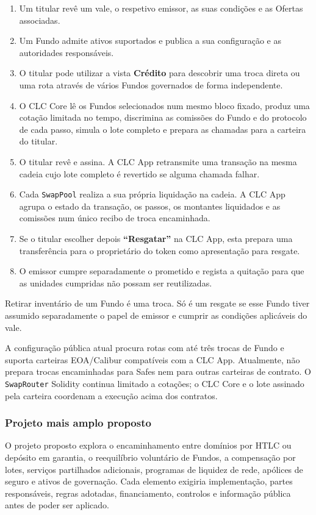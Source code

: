 \documentclass[11pt]{article}
\begin{document}
\begin{enumerate}[leftmargin=*]
\item Um titular revê um vale, o respetivo emissor, as suas condições e as Ofertas associadas.
\item Um Fundo admite ativos suportados e publica a sua configuração e as autoridades responsáveis.
\item O titular pode utilizar a vista \textbf{Crédito} para descobrir uma troca direta ou uma rota através de vários Fundos governados de forma independente.
\item O CLC Core lê os Fundos selecionados num mesmo bloco fixado, produz uma cotação limitada no tempo, discrimina as comissões do Fundo e do protocolo de cada passo, simula o lote completo e prepara as chamadas para a carteira do titular.
\item O titular revê e assina. A CLC App retransmite uma transação na mesma cadeia cujo lote completo é revertido se alguma chamada falhar.
\item Cada \texttt{SwapPool} realiza a sua própria liquidação na cadeia. A CLC App agrupa o estado da transação, os passos, os montantes liquidados e as comissões num único recibo de troca encaminhada.
\item Se o titular escolher depois \textbf{``Resgatar''} na CLC App, esta prepara uma transferência para o proprietário do token como apresentação para resgate.
\item O emissor cumpre separadamente o prometido e regista a quitação para que as unidades cumpridas não possam ser reutilizadas.
\end{enumerate}
Retirar inventário de um Fundo é uma troca. Só é um resgate se esse Fundo tiver assumido separadamente o papel de emissor e cumprir as condições aplicáveis do vale.

A configuração pública atual procura rotas com até três trocas de Fundo e suporta carteiras EOA/Calibur compatíveis com a CLC App. Atualmente, não prepara trocas encaminhadas para Safes nem para outras carteiras de contrato. O \texttt{SwapRouter} Solidity continua limitado a cotações; o CLC Core e o lote assinado pela carteira coordenam a execução acima dos contratos.

\subsubsection*{Projeto mais amplo proposto}

O projeto proposto explora o encaminhamento entre domínios por HTLC ou depósito em garantia, o reequilíbrio voluntário de Fundos, a compensação por lotes, serviços partilhados adicionais, programas de liquidez de rede, apólices de seguro e ativos de governação. Cada elemento exigiria implementação, partes responsáveis, regras adotadas, financiamento, controlos e informação pública antes de poder ser aplicado.
\end{document}
